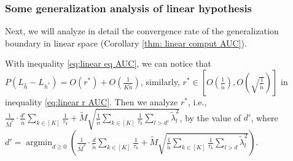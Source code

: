 \documentclass{article}
\DeclareMathOperator*{\argmin}{argmin}
\begin{document}
\subsubsection{Some generalization analysis of linear hypothesis}
\label{sec-app:macro-auc-results}
Next, we will analyze in detail the convergence rate of the generalization boundary in linear space (Corollary \ref{thm: linear comput AUC}).

With inequality \eqref{eq:linear eq AUC}, we can notice that $P(L_{\hat{h}} - L_{h^*}) = O(r^*) + O(\frac{1}{K \tilde{n}}) $, similarly, $r^* \in [O(\frac{1}{\tilde{n}}), O(\sqrt{\frac{1}{\tilde{n}}})]$ in inequality \eqref{eq:linear r AUC}. Then we analyze $r^*$, i.e., $\frac{1}{\bar{M}^2} \cdot \frac{d'}{\tilde{n}} \sum_{k \in [K]} \frac{1}{\tau_k} + \widetilde{M} \sqrt{\frac{1}{\tilde{n}} \sum_{k \in [K]} \frac{1}{\tau_k} \sum_{l > d'} \widetilde{\lambda}_l^2 } $, by the value of $d'$, where $d' = \argmin_{d \geq 0} (\frac{1}{\bar{M}^2} \cdot \frac{d}{\tilde{n}} \sum_{k \in [K]} \frac{1}{\tau_k} + \widetilde{M} \sqrt{\frac{1}{\tilde{n}} \sum_{k \in [K]} \frac{1}{\tau_k} \sum_{l > d} \widetilde{\lambda}_l^2 }) $. 
\end{document}
